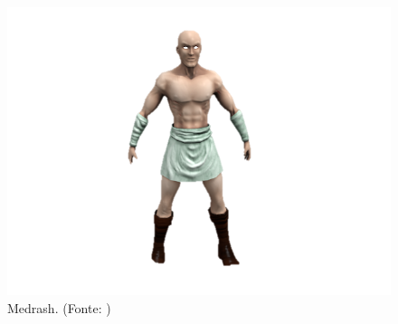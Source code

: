 \begin{figure}[H]
 \centering
 \includegraphics[scale=1]{Imagens/medrash01.png}
 \caption{Medrash. (Fonte: \cite{bib:medrash01})}
\label{img:medrash}
\end{figure}

